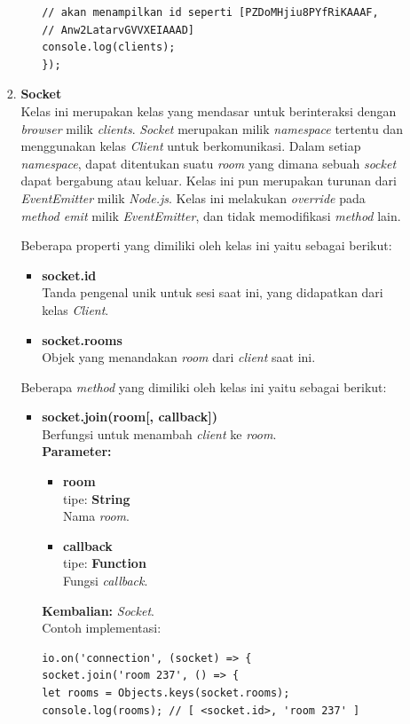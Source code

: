 \documentclass[a4paper,twoside]{article}
\begin{document}
\begin{enumerate}
\begin{enumerate}
\begin{enumerate}
\begin{itemize}
\begin{lstlisting}
// akan menampilkan id seperti [PZDoMHjiu8PYfRiKAAAF, 
// Anw2LatarvGVVXEIAAAD]
console.log(clients); 
});
\end{lstlisting}
				\end{itemize}
				
				\item \textbf{Socket} \\
				Kelas ini merupakan kelas yang mendasar untuk berinteraksi dengan \textit{browser} milik \textit{clients}. \textit{Socket} merupakan milik \textit{namespace} tertentu dan menggunakan kelas \textit{Client} untuk berkomunikasi. Dalam setiap \textit{namespace}, dapat ditentukan suatu \textit{room} yang dimana sebuah \textit{socket} dapat bergabung atau keluar. Kelas ini pun merupakan turunan dari \textit{EventEmitter} milik \textit{Node.js}. Kelas ini melakukan \textit{override} pada \textit{method emit} milik \textit{EventEmitter}, dan tidak memodifikasi \textit{method} lain.
				
				Beberapa properti yang dimiliki oleh kelas ini yaitu sebagai berikut:
				\begin{itemize}
					\item \textbf{socket.id} \\ Tanda pengenal unik untuk sesi saat ini, yang didapatkan dari kelas \textit{Client}.
					\item \textbf{socket.rooms} \\ Objek yang menandakan \textit{room} dari \textit{client} saat ini.
				\end{itemize}
				
				Beberapa \textit{method} yang dimiliki oleh kelas ini yaitu sebagai berikut:
				\begin{itemize}
					\item \textbf{socket.join(room[, callback])} \\
					Berfungsi untuk menambah \textit{client} ke \textit{room}. \\
					\textbf{Parameter:}
					\begin{itemize}
						\item \textbf{room} \\tipe: \textbf{String} \\ Nama \textit{room}.
						\item \textbf{callback} \\tipe: \textbf{Function} \\ Fungsi \textit{callback}.
					\end{itemize}
					\textbf{Kembalian:} \textit{Socket}. \\
					Contoh implementasi:
\begin{lstlisting}
io.on('connection', (socket) => {
socket.join('room 237', () => {
let rooms = Objects.keys(socket.rooms);
console.log(rooms); // [ <socket.id>, 'room 237' ]
					

\end{lstlisting}
\end{itemize}
\end{enumerate}
\end{enumerate}
\end{enumerate}
\end{document}
